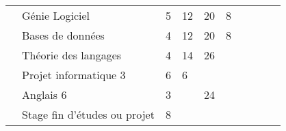 \begin{tabular}{c|m{6cm}|cm{1cm}|cm{1cm}|cm{1cm}|cm{1cm}|}
 & \cellcolor{couleurClaire} \color{couleurTexte} \mbox{Génie} \mbox{Logiciel}  & \cellcolor{couleurClaire} \color{couleurTexte} 5 & \cellcolor{couleurClaire} \color{couleurTexte} 12 & \cellcolor{couleurClaire} \color{couleurTexte} 20 & \cellcolor{couleurClaire} \color{couleurTexte} 8 \\ \cline{2-6}
 & \color{black} \mbox{Bases} \mbox{de} \mbox{données}  & \color{black} 4 & \color{black} 12 & \color{black} 20 & \color{black} 8 \\ \cline{2-6}
 & \cellcolor{couleurClaire} \color{couleurTexte} \mbox{Théorie} \mbox{des} \mbox{langages}  & \cellcolor{couleurClaire} \color{couleurTexte} 4 & \cellcolor{couleurClaire} \color{couleurTexte} 14 & \cellcolor{couleurClaire} \color{couleurTexte} 26 & \cellcolor{couleurClaire} \color{couleurTexte}  \\ \cline{2-6}
 & \color{black} \mbox{Projet} \mbox{informatique} \mbox{3}  & \color{black} 6 & \color{black} 6 & \color{black}  & \color{black}  \\ \cline{2-6}
 & \cellcolor{couleurClaire} \color{couleurTexte} \mbox{Anglais} \mbox{6}  & \cellcolor{couleurClaire} \color{couleurTexte} 3 & \cellcolor{couleurClaire} \color{couleurTexte}  & \cellcolor{couleurClaire} \color{couleurTexte} 24 & \cellcolor{couleurClaire} \color{couleurTexte}  \\ \cline{2-6}
 & \color{black} \mbox{Stage} \mbox{fin} \mbox{d'études} \mbox{ou} \mbox{projet}  & \color{black} 8 & \color{black}  & \color{black}  & \color{black}  \\ \cline{2-6}
\hline
\end{tabular}
